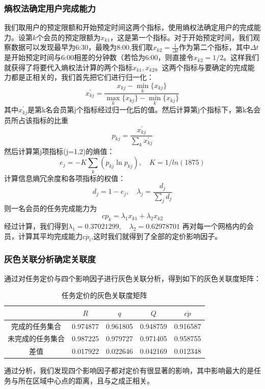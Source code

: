 \documentclass[withoutpreface,bwprint]{cumcmthesis} %
\begin{document}
\subsubsection{熵权法确定用户完成能力}

我们取用户的预定限额和开始预定时间这两个指标，使用熵权法确定用户的完成能力。设第$k$个会员的预定限额为$x_{k1}$，这是第一个指标。对于开始预定时间，我们观察数据可以发现最早为6:30，最晚为8:00,我们取$x_{k2}=\frac{1}{\Delta t}$作为第二个指标，其中$\Delta t$是开始预定时间与6:00相差的分钟数（若恰为6:00，则直接令$x_{k2}=1/2$。这样我们就获得了将要代入熵权法计算的两个指标$x_{k1},x_{k2}$。这两个指标与要确定的完成能力都是正相关的，我们首先把它们进行归一化：
$$x_{kj}^\prime=\frac{x_{kj}-\min_{k} \{x_{kj}\}}{\max_{k} \{x_{kj}\} - \min_{k} \{x_{kj}\}}$$
其中$x_{kj}^\prime$是第k名会员第j个指标经过归一化后的值。然后计算第j个指标下，第k名会员所占该指标的比重
$$p_{kj}=\frac{x_{kj}^\prime}{\sum_{k} x_{kj}^\prime}$$
然后计算第j项指标(j=1,2)的熵值：
$$e_j=-K\sum_{k} (p_{kj}\ln p_{kj}),\quad K=1/ln(1875)$$
计算信息熵冗余度和各项指标的权值：
$$d_j=1-e_j,\quad \lambda_j=\frac{d_j}{\sum_j d_j}$$
则一名会员的任务完成能力为
$$cp_k=\lambda_1x_{k1}+\lambda_2x_{k2}$$
经过计算，我们得到$\lambda_1=0.37021299,\quad \lambda_2=0.62978701$
再对每一个网格内的会员，计算其平均完成能力$\overline{cp_i}$,这时我们就得到了全部的定价影响因子。

\subsubsection{灰色关联分析确定关联度}

通过对任务定价与四个影响因子进行灰色关联分析，得到如下的灰色关联度矩阵：
\begin{table}[H]
    \centering
    \caption{任务定价的灰色关联度矩阵}
    \label{tab:表}
    \begin{tabular}{|c|c|c|c|c|}
        \hline
                         & $R$      & $q$      & $Q$      & $\overline{cp}$ \\ \hline
        完成的任务集合   & 0.974877 & 0.961805 & 0.948759 & 0.916587        \\ \hline
        未完成的任务集合 & 0.987225 & 0.979727 & 0.971405 & 0.958755        \\ \hline
        差值             & 0.017922 & 0.022646 & 0.042169 & 0.012348        \\ \hline
    \end{tabular}
\end{table}
通过分析，我们发现四个影响因子都对定价有很显著的影响，其中影响最大的是任务与所在区域中心点的距离，且与之成正相关。
\end{document}
